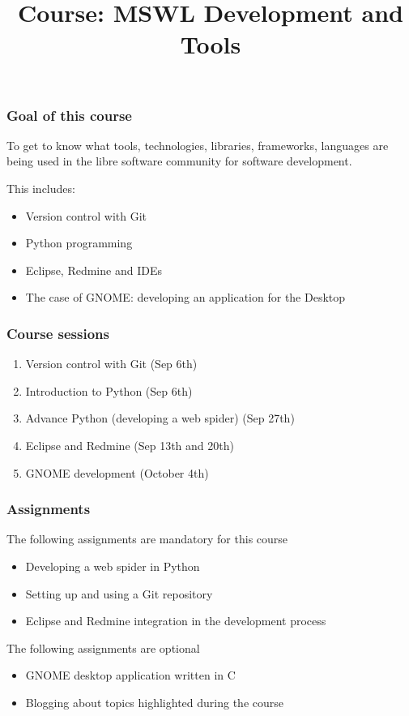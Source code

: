 \documentclass[11pt]{beamer}
\institute{}
\title{Course: MSWL Development and Tools}
\author{}
\begin{document}
\maketitle



   
\begin{frame}[fragile]\frametitle{Goal of this course}
\label{sec-1_1}

To get to know what tools, technologies, libraries, frameworks,
languages are being used in the libre software community for software
development.

This includes:

\begin{itemize}

\item Version control with Git
\item Python programming
\item Eclipse, Redmine and IDEs
\item The case of GNOME: developing an application for the Desktop

\end{itemize}
\end{frame}

\begin{frame}[fragile]\frametitle{Course sessions}
\label{sec-1_2}

\begin{enumerate}
\item Version control with Git (Sep 6th)
\item Introduction to Python (Sep 6th)
\item Advance Python (developing a web spider) (Sep 27th)
\item Eclipse and Redmine (Sep 13th and 20th)
\item GNOME development (October 4th)
\end{enumerate}


\end{frame}
\begin{frame}[fragile]\frametitle{Assignments}
\label{sec-1_3}

The following assignments are mandatory for this course
\begin{itemize}
\item Developing a web spider in Python
\item Setting up and using a Git repository
\item Eclipse and Redmine integration in the development process
\end{itemize}


The following assignments are optional
\begin{itemize}
\item GNOME desktop application written in C
\item Blogging about topics highlighted during the course
\end{itemize}
\end{frame}
\end{document}
